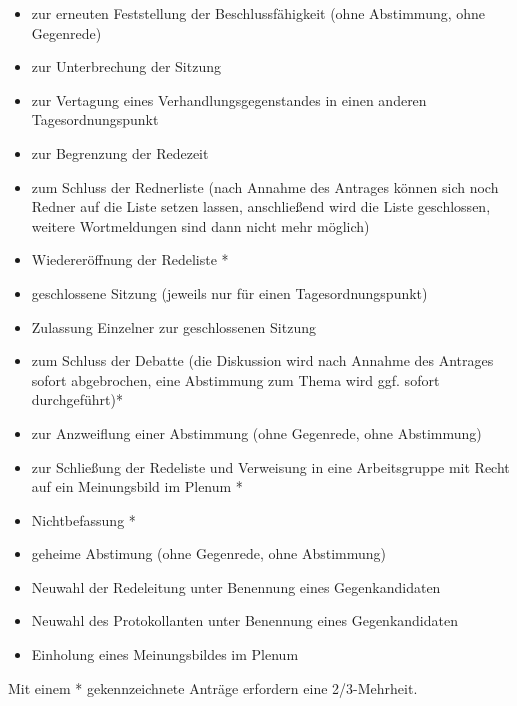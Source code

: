 \documentclass[draft,12pt,oneside]{scrreprt}
\begin{document}
\begin{enumerate}
\begin{itemize}
      \item zur erneuten Feststellung der Beschlussfähigkeit
            (ohne Abstimmung, ohne Gegenrede)

      \item zur Unterbrechung der Sitzung

      \item zur Vertagung eines Verhandlungsgegenstandes in einen anderen Tagesordnungspunkt

      \item zur Begrenzung der Redezeit

      \item zum Schluss der Rednerliste (nach Annahme des Antrages können sich
            noch Redner auf die Liste setzen lassen, anschließend wird die Liste
            geschlossen, weitere Wortmeldungen sind dann nicht mehr möglich)

      \item Wiedereröffnung der Redeliste *

      \item geschlossene Sitzung (jeweils nur für einen Tagesordnungspunkt)

      \item Zulassung Einzelner zur geschlossenen Sitzung

      \item zum Schluss der Debatte (die Diskussion wird nach Annahme des
            Antrages sofort abgebrochen, eine Abstimmung zum Thema wird ggf.
            sofort durchgeführt)*

      \item zur Anzweiflung einer Abstimmung (ohne Gegenrede, ohne Abstimmung)

      \item zur Schließung der Redeliste und Verweisung in eine Arbeitsgruppe mit
            Recht auf ein Meinungsbild im Plenum *

      \item Nichtbefassung *

      \item geheime Abstimung (ohne Gegenrede, ohne Abstimmung)

      \item Neuwahl der Redeleitung unter Benennung eines Gegenkandidaten

      \item Neuwahl des Protokollanten unter Benennung eines Gegenkandidaten

      \item Einholung eines Meinungsbildes im Plenum
    \end{itemize}
    Mit einem * gekennzeichnete Anträge erfordern eine 2/3-Mehrheit.
\end{enumerate}
\end{document}
